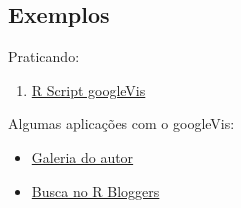

\subsection{Exemplos}

\begin{frame}

  Praticando:
  \begin{enumerate}
  \item \href{run:../googleVis/googleVis.html}{R Script googleVis}
  \end{enumerate}

  \vspace{0.5cm} Algumas aplicações com o googleVis:
  \begin{itemize}
  \item
    \href{http://cran.r-project.org/web/packages/googleVis/vignettes/}{
      Galeria do autor}
  \item \href{http://www.r-bloggers.com/?s=googleVis}{Busca no R
      Bloggers}
  \end{itemize}

\end{frame}
